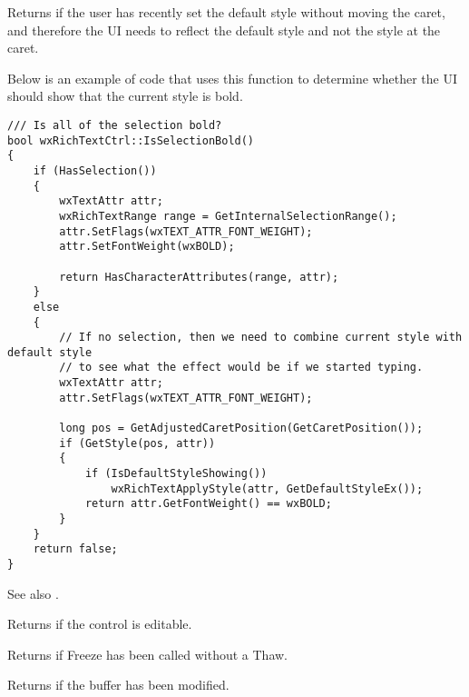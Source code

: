 
Returns \true if the user has recently set the default style without moving the caret,
and therefore the UI needs to reflect the default style and not the style at the caret.

Below is an example of code that uses this function to determine whether the UI
should show that the current style is bold.

\begin{verbatim}
/// Is all of the selection bold?
bool wxRichTextCtrl::IsSelectionBold()
{
    if (HasSelection())
    {
        wxTextAttr attr;
        wxRichTextRange range = GetInternalSelectionRange();
        attr.SetFlags(wxTEXT_ATTR_FONT_WEIGHT);
        attr.SetFontWeight(wxBOLD);

        return HasCharacterAttributes(range, attr);
    }
    else
    {
        // If no selection, then we need to combine current style with default style
        // to see what the effect would be if we started typing.
        wxTextAttr attr;
        attr.SetFlags(wxTEXT_ATTR_FONT_WEIGHT);

        long pos = GetAdjustedCaretPosition(GetCaretPosition());
        if (GetStyle(pos, attr))
        {
            if (IsDefaultStyleShowing())
                wxRichTextApplyStyle(attr, GetDefaultStyleEx());
            return attr.GetFontWeight() == wxBOLD;
        }
    }
    return false;
}
\end{verbatim}

See also .

\label{wxrichtextctrliseditable}


Returns \true if the control is editable.

\label{wxrichtextctrlisfrozen}


Returns \true if Freeze has been called without a Thaw.

\label{wxrichtextctrlismodified}


Returns \true if the buffer has been modified.

\label{wxrichtextctrlismultiline}

